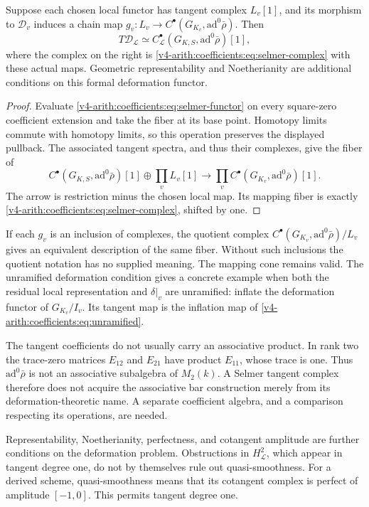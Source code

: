 \begin{theorem}\label{v4-arith:coefficients:thm:selmer-tangent}
Suppose each chosen local functor has tangent complex \(L_v[1]\),
and its morphism to \(\mathcal D_v\) induces a chain map
\(g_v:L_v\to C^\bullet(G_{K_v},\mathrm{ad}^0\bar\rho)\).
Then
\[
 T\mathcal D_{\mathcal L}
 \simeq C^\bullet_{\mathcal L}
          (G_{K,S},\mathrm{ad}^0\bar\rho)[1],
\]
where the complex on the right is
\eqref{v4-arith:coefficients:eq:selmer-complex} with these actual
maps. Geometric representability and Noetherianity are additional
conditions on this formal deformation functor.
\end{theorem}
\begin{proof}
Evaluate \eqref{v4-arith:coefficients:eq:selmer-functor} on every
square-zero coefficient extension and take the fiber at its base
point. Homotopy limits commute with homotopy limits, so this operation
preserves the displayed pullback. The associated tangent spectra,
and thus their complexes, give the fiber of
\[
 C^\bullet(G_{K,S},\mathrm{ad}^0\bar\rho)[1]
 \oplus\prod_vL_v[1]
 \longrightarrow
 \prod_vC^\bullet(G_{K_v},\mathrm{ad}^0\bar\rho)[1].
\]
The arrow is restriction minus the chosen local map. Its mapping
fiber is exactly \eqref{v4-arith:coefficients:eq:selmer-complex},
shifted by one.
\end{proof}

If each \(g_v\) is an inclusion of complexes, the quotient complex
\(C^\bullet(G_{K_v},\mathrm{ad}^0\bar\rho)/L_v\) gives an equivalent
description of the same fiber. Without such inclusions the quotient
notation has no supplied meaning. The mapping cone remains valid.
The unramified deformation condition gives a concrete example when
both the residual local representation and \(\delta|_v\) are
unramified: inflate the deformation functor of \(G_{K_v}/I_v\). Its tangent map is the
inflation map of \eqref{v4-arith:coefficients:eq:unramified}.

The tangent coefficients do not usually carry an associative product.
In rank two the trace-zero matrices \(E_{12}\) and \(E_{21}\) have
product \(E_{11}\), whose trace is one. Thus
\(\mathrm{ad}^0\bar\rho\) is not an associative subalgebra of
\(M_2(k)\). A Selmer tangent complex therefore does not acquire the
associative bar construction merely from its deformation-theoretic
name. A separate coefficient algebra, and a comparison respecting its
operations, are needed.

Representability, Noetherianity, perfectness, and cotangent amplitude
are further conditions on the deformation problem. Obstructions in
\(H^2_{\mathcal L}\), which appear in tangent degree one, do not
by themselves rule out quasi-smoothness. For a derived scheme,
quasi-smoothness means that its cotangent complex is perfect of
amplitude \([-1,0]\). This permits tangent degree one.

